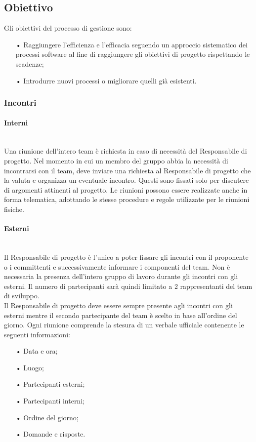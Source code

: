 \subsection{Obiettivo}
Gli obiettivi del processo di gestione sono:
\begin{itemize}
\item[•] Raggiungere l’efficienza e l’efficacia seguendo un approccio sistematico dei processi software al fine di raggiungere gli obiettivi di progetto rispettando le scadenze;
\item[•] Introdurre nuovi processi o migliorare quelli già esistenti.
\end{itemize}

\subsubsection{Incontri}

\paragraph{Interni}\mbox{}\\
Una riunione dell'intero team è richiesta in caso di necessità del Responsabile di progetto. Nel momento in cui un membro del gruppo abbia la necessità di incontrarsi con il team, deve inviare una richiesta al Responsabile di progetto che la valuta e organizza un eventuale incontro. Questi sono fissati solo per discutere di argomenti attinenti al progetto.
Le riunioni possono essere realizzate anche in forma {telematica}, adottando le stesse procedure e regole utilizzate per le riunioni fisiche.

\paragraph{Esterni}\mbox{}\\
Il Responsabile di progetto è l'unico a poter fissare gli incontri con il proponente o i committenti e successivamente informare i componenti del team. Non è necessaria la presenza dell'intero gruppo di lavoro durante gli incontri con gli esterni. Il numero di partecipanti sarà quindi limitato a 2 rappresentanti del team di sviluppo.  
\\
Il Responsabile di progetto deve essere sempre presente agli incontri con gli esterni mentre il secondo partecipante del team è scelto in base all'ordine del giorno. 
\newline
Ogni riunione comprende la stesura di un verbale ufficiale contenente le seguenti informazioni:
\begin{itemize}
\item[•] Data e ora;
\item[•] Luogo;
\item[•] Partecipanti esterni;
\item[•] Partecipanti interni;
\item[•] Ordine del giorno;
\item[•] Domande e risposte.
\end{itemize}


